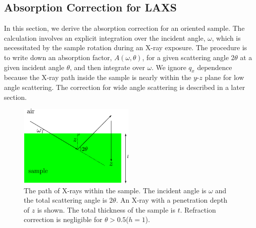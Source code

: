 \subsection{Absorption Correction for LAXS}\label{sec:absorption_correction}
In this section, we derive the absorption correction for an oriented sample. 
The calculation involves an explicit integration over the incident angle, 
$\omega$, which is necessitated by the sample rotation during an X-ray exposure. 
The procedure is to write down an absorption factor, $A(\omega,\theta)$, for a 
given scattering angle 2$\theta$ at a given incident angle $\theta$, and
then integrate over $\omega$. We ignore $q_x$ dependence because the X-ray
path inside the sample is nearly within the $y$-$z$ plane for low angle
scattering. The correction for wide angle scattering is described in a later
section.

\begin{figure}[htbp]
  \centering
  \includegraphics[width=0.5\textwidth]{figures/ripple/analysis/absorption_LAXS}
  \caption{The path of X-rays within the sample. The incident angle is 
  $\omega$ and the total scattering angle is $2\theta$. An X-ray with a
  penetration depth of $z$ is shown. The total thickness of the sample
  is $t$. Refraction correction is negligible for 
  $\theta > 0.5$\textdegree ($h=1$).}
  \label{fig:absorption_LAXS}
\end{figure}

